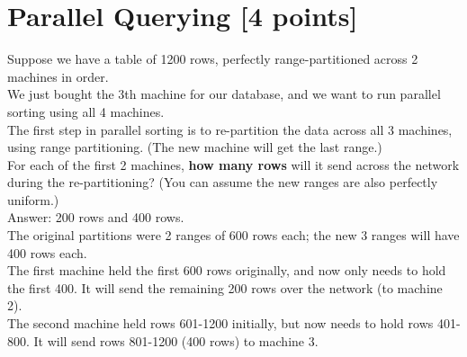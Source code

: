 \documentclass[10pt]{article}
\begin{document}
\section{ \textbf{Parallel Querying  [4 points]}}
Suppose we have a table of 1200 rows, perfectly range-partitioned across 2 machines in order.\\
We just bought the 3th machine for our database, and we want to run parallel sorting using all 4 machines.\\
The first step in parallel sorting is to re-partition the data across all 3 machines, using range partitioning. (The new machine will get the last range.)\\
For each of the first 2 machines, \textbf{how many rows} will it send across the network during the re-partitioning? (You can assume the new ranges are also perfectly uniform.)\\
{\color{red}  Answer: 200 rows and 400 rows.\\
The original partitions were 2 ranges of 600 rows each; the new 3 ranges will have 400 rows each.\\
The first machine held the first 600 rows originally, and now only needs to hold the first 400. It will send the remaining 200 rows over the network (to machine 2).\\
The second machine held rows 601-1200 initially, but now needs to hold rows 401-800. It will send rows 801-1200 (400 rows) to machine 3.}
\end{document}
